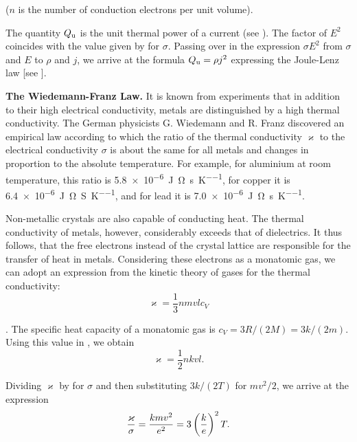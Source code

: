 \noindent
($n$ is the number of conduction electrons per unit volume).

The quantity $Q_{\text{u}}$ is the unit thermal power of a current (see ).
The factor of $E^2$ coincides with the value given by  for $\sigma$.
Passing over in the expression $\sigma E^2$ from $\sigma$ and $E$ to $\rho$ and $j$, we arrive at the formula $Q_{\text{u}}=\rho j^2$ expressing the Joule-Lenz law [see ].

\textbf{The Wiedemann-Franz Law.} It is known from experiments that in addition to their high electrical conductivity, metals are distinguished by a high thermal conductivity.
The German physicists G. Wiedemann and R. Franz discovered an empirical law according to which the ratio of the thermal conductivity $\varkappa$ to the electrical conductivity $\sigma$ is about the same for all metals and changes in proportion to the absolute temperature.
For example, for aluminium at room temperature, this ratio is \SI{5.8e-6}{\joule\ohm\per\second\per\kelvin}, for copper it is \SI{6.4e-6}{\joule\ohm\per\siemens\per\kelvin}, and for lead it is \SI{7.0e-6}{\joule\ohm\per\second\per\kelvin}.

Non-metallic crystals are also capable of conducting heat.
The thermal conductivity of metals, however, considerably exceeds that of dielectrics.
It thus follows, that the free electrons instead of the crystal lattice are responsible for the transfer of heat in metals.
Considering these electrons as a monatomic gas, we can adopt an expression from the kinetic theory of gases for the thermal conductivity:
\begin{equation}\label{eq:11_11}
    \varkappa = \frac{1}{3} n m v l c_V
\end{equation}

.
The specific heat capacity of a monatomic gas is $c_V = 3R/(2M) = 3k/(2m)$.
Using this value in , we obtain
\begin{equation*}
    \varkappa = \frac{1}{2} n k v l.
\end{equation*}

Dividing $\varkappa$ by  for $\sigma$ and then substituting $3k/(2T)$ for $mv^2/2$, we arrive at the expression
\begin{equation}\label{eq:11_12}
    \frac{\varkappa}{\sigma} = \frac{k m v^2}{e^2} = 3 \left(\frac{k}{e}\right)^2 T.
\end{equation}

